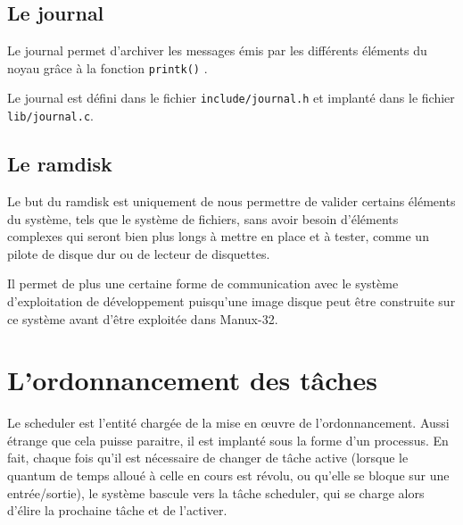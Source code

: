 \documentclass{book}
\begin{document}
\subsection{Le journal}

   Le journal permet d'archiver les messages émis par les différents
éléments du noyau grâce à la fonction \lstinline!printk()!
.

   Le journal est défini dans le fichier {\tt include/journal.h} et implanté
dans le fichier {\tt lib/journal.c}.

%
\subsection{Le ramdisk}
 
   Le but du ramdisk est uniquement de nous permettre de valider
certains éléments du système, tels que le système de fichiers, sans
avoir besoin d'éléments complexes qui seront bien plus longs à mettre
en place et à tester, comme un pilote de disque dur ou de lecteur de
disquettes.

   Il permet de plus une certaine forme de communication avec le
système d'exploitation de développement puisqu'une image disque peut
être construite sur ce système avant d'être exploitée dans Manux-32.





\section{L'ordonnancement des tâches}

   Le scheduler est l'entité chargée de la mise en \oe{}uvre de
l'ordonnancement. Aussi étrange que cela puisse paraitre, il est
implanté sous la forme d'un processus. En fait, chaque fois qu'il est
nécessaire de changer de tâche active (lorsque le quantum de temps
alloué à celle en cours est révolu, ou qu'elle se bloque sur une
entrée/sortie), le système bascule vers la tâche scheduler, qui se
charge alors d'élire la prochaine tâche et de l'activer.
\end{document}
